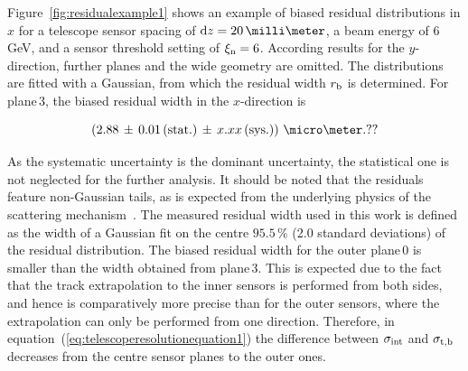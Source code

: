 \noindent

Figure~\ref{fig:residualexample1} shows an example of biased residual distributions in $x$ for a telescope sensor spacing of $\dz = 20\,\milli\meter$,
 a beam energy of 6\,GeV, and a sensor threshold setting of $\xi_{\textrm{n}} = 6$. 
According results for the $y$-direction, further planes and the wide geometry are omitted. 
The distributions are fitted with a Gaussian, from which the residual width $r_{\textrm{b}}$ is determined. 
For plane\,3, the biased residual width in the $x$-direction is 

\begin{equation}
\left( 2.88\,\pm\, 0.01\,\textrm{(stat.)}\,\pm\, x.xx\, \textrm{(sys.)}\right)\,\micro\meter. ??
\end{equation}

\noindent
As the systematic uncertainty is the dominant uncertainty, the statistical one is not neglected for the further analysis. 
It should be noted that the residuals feature non-Gaussian tails, as is expected from the underlying physics of the scattering mechanism~\cite{ref:PDG-2014}. 
The measured residual width used in this work is defined as the width of a Gaussian fit on the centre $95.5\,\%$ (2.0 standard deviations) of the residual distribution.
The biased residual width for the outer plane\,0 is smaller than the width obtained from plane\,3.
This is expected due to the fact that the track extrapolation to the inner sensors is performed from both sides, and hence is comparatively more precise than for the outer sensors,
 where the extrapolation can only be performed from one direction. 
Therefore, in equation~(\ref{eq:telescoperesolutionequation1}) the difference between $\sigma_{\textrm{int}}$ and $\sigma_{\textrm{t,b}}$ decreases from the centre sensor planes to the outer ones. 

% 

